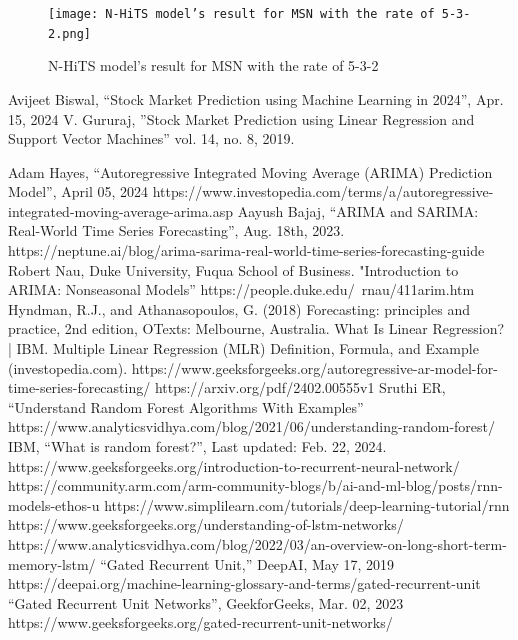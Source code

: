 \documentclass{ieeeojies}
\begin{document}
    \begin{figure}[H]
    \begin{minipage}{0.23\textwidth}
    \centering
    \texttt{[image: N-HiTS model’s result for MSN with the rate of 5-3-2.png]}
    \caption{N-HiTS model’s result for MSN with the rate of 5-3-2}
    \end{minipage}
    \end{figure}
   
\begin{thebibliography}{00}
 Avijeet Biswal, “Stock Market Prediction using Machine Learning in 2024”, Apr. 15, 2024
 V. Gururaj, ”Stock Market Prediction using Linear Regression and Support Vector Machines” vol. 14, no. 8, 2019.

 Adam Hayes, “Autoregressive Integrated Moving Average (ARIMA) Prediction Model”, April 05, 2024
https://www.investopedia.com/terms/a/autoregressive-integrated-moving-average-arima.asp
 Aayush Bajaj, “ARIMA and SARIMA: Real-World Time Series Forecasting”, Aug. 18th, 2023.
https://neptune.ai/blog/arima-sarima-real-world-time-series-forecasting-guide
 Robert Nau, Duke University, Fuqua School of Business. "Introduction to ARIMA: Nonseasonal Models”
https://people.duke.edu/~rnau/411arim.htm
 Hyndman, R.J., and Athanasopoulos, G. (2018) Forecasting: principles and practice, 2nd edition, OTexts: Melbourne, Australia. 
 What Is Linear Regression? | IBM.
 Multiple Linear Regression (MLR) Definition, Formula, and Example (investopedia.com).
 https://www.geeksforgeeks.org/autoregressive-ar-model-for-time-series-forecasting/
https://arxiv.org/pdf/2402.00555v1
 Sruthi ER, “Understand Random Forest Algorithms With Examples”
https://www.analyticsvidhya.com/blog/2021/06/understanding-random-forest/
 IBM, “What is random forest?”, Last updated: Feb. 22, 2024.
 https://www.geeksforgeeks.org/introduction-to-recurrent-neural-network/
 https://community.arm.com/arm-community-blogs/b/ai-and-ml-blog/posts/rnn-models-ethos-u
  https://www.simplilearn.com/tutorials/deep-learning-tutorial/rnn
https://www.geeksforgeeks.org/understanding-of-lstm-networks/
https://www.analyticsvidhya.com/blog/2022/03/an-overview-on-long-short-term-memory-lstm/
“Gated Recurrent Unit,” DeepAI, May 17, 2019 https://deepai.org/machine-learning-glossary-and-terms/gated-recurrent-unit
“Gated Recurrent Unit Networks”, GeekforGeeks, Mar. 02, 2023 https://www.geeksforgeeks.org/gated-recurrent-unit-networks/
\end{thebibliography}


\EOD
\end{document}
